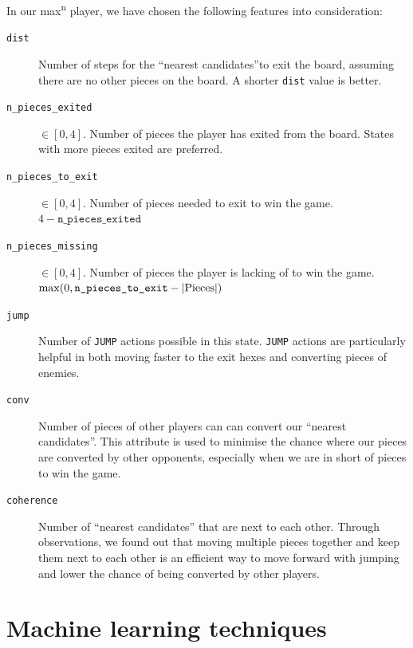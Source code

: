 \documentclass[12pt,a4paper]{article}
\newcommand{\maxn}{max\textsuperscript{n}}
\begin{document}
In our \maxn{} player, we have chosen the following features into 
consideration:

\begin{description}
    \item[\texttt{dist}] Number of steps for the 
        ``nearest candidates''\footnotemark to exit the board, assuming there 
        are no other pieces on the board. A shorter \texttt{dist} value 
        is better.
    \item[\texttt{n\_pieces\_exited}]  $\in [0, 4]$. Number of pieces the 
        player has exited from the board. States with more pieces 
        exited are preferred.
    \item[\texttt{n\_pieces\_to\_exit}] $\in [0, 4]$. Number of pieces needed 
        to exit to win the game. $4 - \texttt{n\_pieces\_exited}$
    \item[\texttt{n\_pieces\_missing}] $\in [0, 4]$. Number of pieces the player
        is lacking of to win the game. \\
        $\max(0, \texttt{n\textunderscore pieces\textunderscore to\textunderscore exit} - |\text{Pieces}|)$
    \item[\texttt{jump}] Number of \texttt{JUMP} actions possible in 
        this state. \texttt{JUMP} actions are particularly helpful in both
        moving faster to the exit hexes and converting pieces of enemies.  
    \item[\texttt{conv}] Number of pieces of other players can can convert
        our ``nearest candidates''. This attribute is used to minimise the
        chance where our pieces are converted by other opponents, especially
        when we are in short of pieces to win the game.
    \item[\texttt{coherence}] Number of ``nearest candidates'' that are next 
        to each other. Through observations, we found out that moving multiple
        pieces together and keep them next to each other is an efficient way
        to move forward with jumping and lower the chance of being converted
        by other players.
\end{description}


\section{Machine learning techniques}
\end{document}
